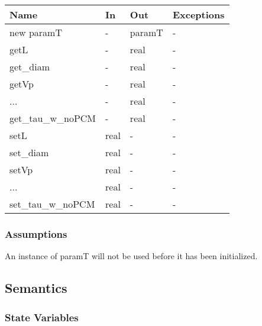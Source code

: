 \documentclass[12pt]{article}
\begin{document}
\begin{tabular}{l l l l}
\toprule
\textbf{Name} & \textbf{In} & \textbf{Out} & \textbf{Exceptions} \\
\midrule
new paramT & - & paramT &  - \\
getL & - & real &  - \\
get\_diam & - & real &  - \\
getVp & - & real &  - \\
... & - & real &  - \\
get\_tau\_w\_noPCM & - & real &  - \\
setL & real & - &  - \\
set\_diam & real & - &  - \\
setVp & real & - &  - \\
... & real & - &  - \\
set\_tau\_w\_noPCM & real & - &  - \\
\bottomrule
\end{tabular}

\subsubsection{Assumptions}

An instance of paramT will not be used before it has been initialized.

\subsection{Semantics}

\subsubsection{State Variables}
\end{document}
